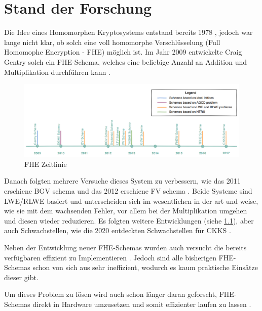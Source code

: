 \chapter{Stand der Forschung}
\label{StandDerForschung}

Die Idee eines Homomorphen Kryptosystems entstand bereits 1978 \cite{Rivest1978ONDB}, jedoch war lange nicht klar, ob solch eine voll homomorphe Verschlüsselung (Full Homomophe Encryption - FHE) möglich ist. Im Jahr 2009 entwickelte Craig Gentry solch ein FHE-Schema, welches eine beliebige Anzahl an Addition und Multiplikation durchführen kann \cite{Gentry2009AFH}. 

\begin{figure}
  \includegraphics[scale=0.45]{bilder/FHE-Timeline.png}
  \caption{FHE Zeitlinie \cite{FHESurvey}}
  \label{fig:FheTimeline}
\end{figure}

Danach folgten mehrere Versuche dieses System zu verbessern, wie das 2011 erschiene BGV schema \cite{BGV} und das 2012 erschiene FV schema \cite{FV}. Beide Systeme sind LWE/RLWE basiert und unterscheiden sich im wesentlichen in der art und weise, wie sie mit dem wachsenden Fehler, vor allem bei der Multiplikation umgehen und diesen wieder reduzieren. Es folgten weitere Entwicklungen (siehe \ref{fig:FheTimeline}), aber auch Schwachstellen, wie die 2020 entdeckten Schwachstellen für CKKS \cite{SecurtyCKKS}.

Neben der Entwicklung neuer FHE-Schemas wurden auch versucht die bereits verfügbaren effizient zu Implementieren  \cite{FheImplementations}. Jedoch sind alle bisherigen FHE-Schemas schon von sich aus sehr ineffizient, wodurch es kaum praktische Einsätze dieser gibt.

Um dieses Problem zu lösen wird auch schon länger daran geforscht, FHE-Schemas direkt in Hardware umzusetzen und somit effizienter laufen zu lassen \cite{FheHardware2014} \cite{FheHardware2023}. 
